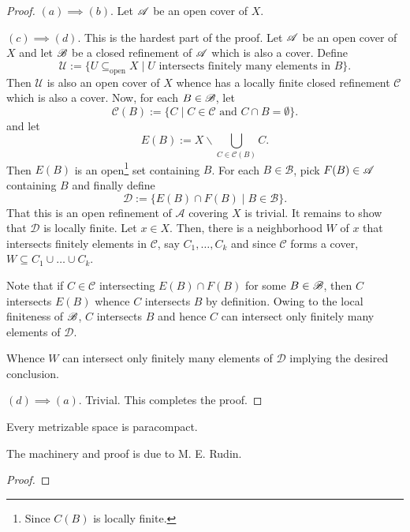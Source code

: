 \begin{proof}
    $(a)\implies(b)$. Let $\mathscr A$  be an open cover of $X$.

    $(c)\implies(d)$. This is the hardest part of the proof. Let $\mathscr A$ be an open cover of $X$ and let $\mathscr B$ be a closed refinement of $\mathscr A$ which is also a cover. Define 
    \begin{equation*}
        \mathscr{U} := \{U\subseteq_{\text{open}} X\mid U \text{ intersects finitely many elements in }B\}.
    \end{equation*}
    Then $\mathscr U$ is also an open cover of $X$ whence has a locally finite closed refinement $\mathscr C$ which is also a cover. Now, for each $B\in\mathscr B$, let 
    \begin{equation*}
        \mathscr C(B) := \{C\mid C\in\mathscr C\text{ and } C\cap B = \emptyset\}.
    \end{equation*}
    and let 
    \begin{equation*}
        E(B) := X\backslash\bigcup_{C\in\mathscr C(B)}C.
    \end{equation*}
    Then $E(B)$ is an open\footnote{Since $C(B)$ is locally finite.} set containing $B$. For each $B\in\mathscr{B}$, pick $F(B)\in\mathscr A$ containing $B$ and finally define 
    \begin{equation*}
        \mathscr D := \{E(B)\cap F(B)\mid B\in\mathscr B\}.
    \end{equation*}
    That this is an open refinement of $\mathscr A$ covering $X$ is trivial. It remains to show that $\mathscr D$ is locally finite. Let $x\in X$. Then, there is a neighborhood $W$ of $x$ that intersects finitely elements in $\mathscr C$, say $C_1,\dots,C_k$ and since $\mathscr C$ forms a cover, $W\subseteq C_1\cup\dots\cup C_k$. 
    
    Note that if $C\in\mathscr C$ intersecting $E(B)\cap F(B)$ for some $B\in\mathscr B$, then $C$ intersects $E(B)$ whence $C$ intersects $B$ by definition. Owing to the local finiteness of $\mathscr B$, $C$ intersects $B$ and hence $C$ can intersect only finitely many elements of $\mathscr D$.

    Whence $W$ can intersect only finitely many elements of $\mathscr D$ implying the desired conclusion.

    $(d)\implies(a)$. Trivial. This completes the proof. 
\end{proof}

\begin{proposition}[A. H. Stone]
    Every metrizable space is paracompact.
\end{proposition}
The machinery and proof is due to M. E. Rudin.
\begin{proof}
    
\end{proof}

